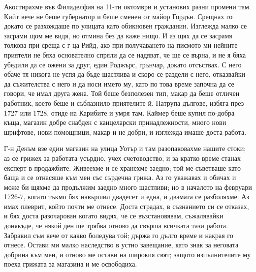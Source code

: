 \documentclass[12pt]{book}
\begin{document}
Акостирахме във Филаделфия на 11-ти октомври и установих разни промени там. Кийт вече не беше губернатор и беше сменен от майор Гордън. Срещнах го докато се разхождаше по улицата като обикновен гражданин. Изглежда малко се засрами щом ме видя, но отмина без да каже нищо. И аз щях да се засрамя толкова при среща с г-ца Рийд, ако при получаването на писмото ми нейните приятели не бяха основателно спряли да се надяват, че ще се върна, и не я бяха убедили да се ожени за друг, един Роджърс, грънчар, докато отсъствах. С него обаче тя никога не успя да бъде щастлива и скоро се раздели с него, отказвайки да съжителства с него и да носи името му, като по това време започна да се говори, че имал друга жена. Той беше безполезен тип, макар да беше отличен работник, което беше и съблазнило приятелите й. Натрупа дългове, избяга през 1727 или 1728, отиде на Карибите и умря там. Каймер беше купил по-добра къща, магазин добре снабден с канцеларски принадлежности, много нови шрифтове, нови помощници, макар и не добри, и изглежда имаше доста работа.

Г-н Денъм взе един магазин на улица Уотър и там разопаковахме нашите стоки; аз се грижех за работата усърдно, учех счетоводство, и за кратко време станах експерт в продажбите. Живеехме и се хранехме заедно; той ме съветваше като баща и се отнасяше към мен със сърдечна грижа. Аз го уважавах и обичах и може би щяхме да продължим заедно много щастливи; но в началото на февруари 1726-7, когато тъкмо бях навършил двадесет и една, и двамата се разболяхме. Аз имах плеврит, който почти ме отнесе. Доста страдах, в съзнанието си се отказах, и бях доста разочарован когато видях, че се възстановявам, съжалявайки донякъде, че някой ден ще трябва отново да свърша всичката тази работа. Забравил съм вече от какво боледува той; държа го дълго време и накрая го отнесе. Остави ми малко наследство в устно завещание, като знак за неговата добрина към мен, и отново ме остави на широкия свят; защото изпълнителите му поеха грижата за магазина и ме освободиха.
\end{document}
